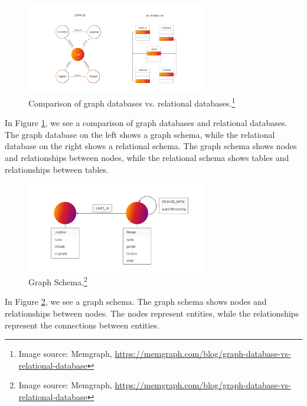 \begin{figure}[ht]
    \centering
    \includegraphics[width=0.7\textwidth]{assets/memgraph-graph-database-vs-relational-database.png}
    \caption{Comparison of graph databases vs. relational databases.\protect\footnote{Image source: Memgraph, \url{https://memgraph.com/blog/graph-database-vs-relational-database}}}
    \label{fig:graph_vs_table}
\end{figure}
In Figure \ref{fig:graph_vs_table}, we see a comparison of graph databases and relational databases. The graph database on the left shows a graph schema, while the relational database on the right shows a relational schema. The graph schema shows nodes and relationships between nodes, while the relational schema shows tables and relationships between tables. 

\begin{figure}[ht]
    \centering
    \includegraphics[width=0.7\textwidth]{assets/memgraph-graph-schema.png}
    \caption{Graph Schema.\protect\footnote{Image source: Memgraph, \url{https://memgraph.com/blog/graph-database-vs-relational-database}}}
    \label{fig:graph_schema}
\end{figure}
In Figure \ref{fig:graph_schema}, we see a graph schema. The graph schema shows nodes and relationships between nodes. The nodes represent entities, while the relationships represent the connections between entities. 

